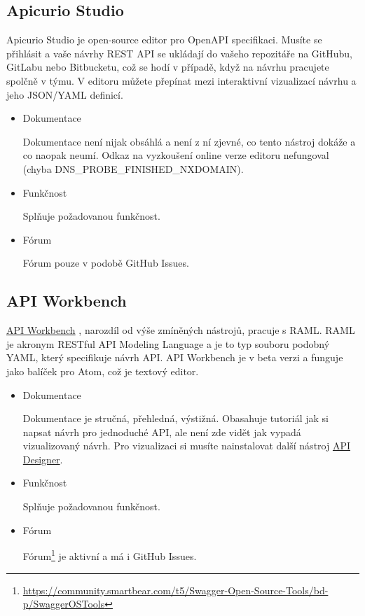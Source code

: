 \documentclass[thesis=B,czech]{FITthesis}[2012/06/26]
\begin{document}
        \subsection{Apicurio Studio}
            Apicurio Studio \cite{apicur} je open-source editor pro OpenAPI specifikaci. Musíte se přihlásit a vaše návrhy REST API se ukládají do vašeho repozitáře na GitHubu, GitLabu nebo Bitbucketu, což se hodí v případě, když na návrhu pracujete spolčně v týmu. V editoru můžete přepínat mezi interaktivní vizualizací návrhu a jeho JSON/YAML definicí.
            \begin{itemize}
                \item Dokumentace
                
                    Dokumentace není nijak obsáhlá a není z ní zjevné, co tento nástroj dokáže a co naopak neumí. Odkaz na vyzkoušení online verze editoru nefungoval (chyba DNS\_PROBE\_FINISHED\_NXDOMAIN).
                \item Funkčnost
                
                    Splňuje požadovanou funkčnost.
                \item Fórum
                
                    Fórum pouze v podobě GitHub Issues.
            \end{itemize}
        \subsection{API Workbench}
            \href{http://apiworkbench.com}{API Workbench} \cite{apiworkbench}, narozdíl od výše zmíněných nástrojů, pracuje s RAML. RAML je akronym RESTful API Modeling Language a je to typ souboru podobný YAML, který specifikuje návrh API. API Workbench je v beta verzi a funguje jako balíček pro Atom, což je textový editor.
            
            \begin{itemize}
                \item Dokumentace
                
                    Dokumentace je stručná, přehledná, výstižná. Obasahuje tutoriál jak si napsat návrh pro jednoduché API, ale není zde vidět jak vypadá vizualizovaný návrh. Pro vizualizaci si musíte nainstalovat další nástroj \href{https://github.com/mulesoft/api-designer}{API Designer}.
                \item Funkčnost
                
                    Splňuje požadovanou funkčnost.
                \item Fórum
                
                    Fórum\footnote{\url{https://community.smartbear.com/t5/Swagger-Open-Source-Tools/bd-p/SwaggerOSTools}} je aktivní a má i GitHub Issues.       
            \end{itemize}
\end{document}
